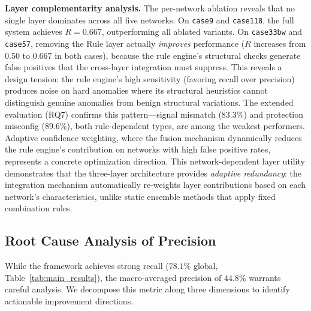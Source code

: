 \documentclass[research]{fcs}
\begin{document}
\textbf{Layer complementarity analysis.} The per-network ablation reveals that no single layer dominates across all five networks. On \texttt{case9} and \texttt{case118}, the full system achieves $R=0.667$, outperforming all ablated variants. On \texttt{case33bw} and \texttt{case57}, removing the Rule layer actually \emph{improves} performance ($R$ increases from $0.50$ to $0.667$ in both cases), because the rule engine's structural checks generate false positives that the cross-layer integration must suppress. This reveals a design tension: the rule engine's high sensitivity (favoring recall over precision) produces noise on hard anomalies where its structural heuristics cannot distinguish genuine anomalies from benign structural variations. The extended evaluation (RQ7) confirms this pattern---signal mismatch (83.3\%) and protection misconfig (89.6\%), both rule-dependent types, are among the weakest performers. Adaptive confidence weighting, where the fusion mechanism dynamically reduces the rule engine's contribution on networks with high false positive rates, represents a concrete optimization direction. This network-dependent layer utility demonstrates that the three-layer architecture provides \emph{adaptive redundancy}: the integration mechanism automatically re-weights layer contributions based on each network's characteristics, unlike static ensemble methods that apply fixed combination rules.

\subsection{Root Cause Analysis of Precision}

While the framework achieves strong recall ($78.1\%$ global, Table~\ref{tab:main_results}), the macro-averaged precision of $44.8\%$ warrants careful analysis. We decompose this metric along three dimensions to identify actionable improvement directions.
\end{document}
